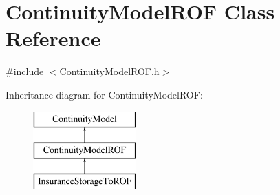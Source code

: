 \hypertarget{classContinuityModelROF}{}\section{Continuity\+Model\+R\+OF Class Reference}
\label{classContinuityModelROF}


{\ttfamily \#include $<$Continuity\+Model\+R\+O\+F.\+h$>$}

Inheritance diagram for Continuity\+Model\+R\+OF\+:\begin{figure}[H]
\begin{center}
\leavevmode
\includegraphics[height=3.000000cm]{classContinuityModelROF}
\end{center}
\end{figure}
